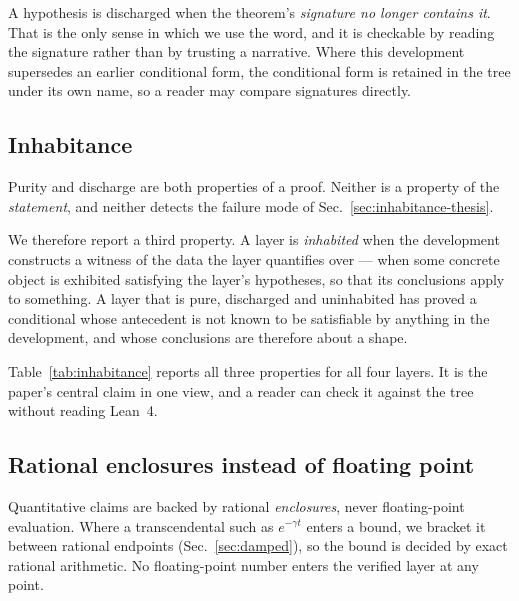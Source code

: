 \documentclass[aps,prd,reprint,nofootinbib,superscriptaddress]{revtex4-2}
\newcommand{\Lean}{Lean~4}
\begin{document}
A hypothesis is discharged when the theorem's \emph{signature no longer contains it}. That is the
only sense in which we use the word, and it is checkable by reading the signature rather than by
trusting a narrative. Where this development supersedes an earlier conditional form, the conditional
form is retained in the tree under its own name, so a reader may compare signatures directly.

\subsection{Inhabitance}
\label{sec:inhabitance-def}

Purity and discharge are both properties of a proof. Neither is a property of the \emph{statement},
and neither detects the failure mode of Sec.~\ref{sec:inhabitance-thesis}.

We therefore report a third property. A layer is \emph{inhabited} when the development constructs a
witness of the data the layer quantifies over --- when some concrete object is exhibited satisfying
the layer's hypotheses, so that its conclusions apply to something. A layer that is pure, discharged
and uninhabited has proved a conditional whose antecedent is not known to be satisfiable by anything
in the development, and whose conclusions are therefore about a shape.

Table~\ref{tab:inhabitance} reports all three properties for all four layers. It is the paper's
central claim in one view, and a reader can check it against the tree without reading \Lean{}.

\begin{table}
\caption{The four formalized layers, measured three ways. Every layer is kernel-pure with the same
axiom profile, so that property separates nothing. The inhabitance column does.}
\label{tab:inhabitance}
\begin{ruledtabular}

\end{ruledtabular}
\end{table}

\subsection{Rational enclosures instead of floating point}

Quantitative claims are backed by rational \emph{enclosures}, never floating-point evaluation. Where
a transcendental such as $e^{-\gamma t}$ enters a bound, we bracket it between rational endpoints
(Sec.~\ref{sec:damped}), so the bound is decided by exact rational arithmetic. No floating-point
number enters the verified layer at any point.
\end{document}
